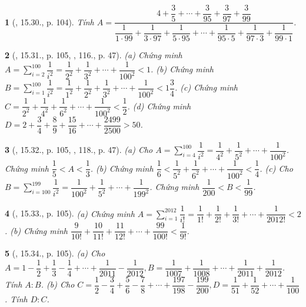 \documentclass{article}
\newtheorem{baitoan}{}
\begin{document}
\begin{baitoan}[\cite{TLCT_THCS_Toan_6_so_hoc}, 15.30., p. 104]
	Tính $A = \dfrac{4 + \dfrac{3}{5} + \cdots + \dfrac{3}{95} + \dfrac{3}{97} + \dfrac{3}{99}}{\dfrac{1}{1\cdot99} + \dfrac{1}{3\cdot97} + \dfrac{1}{5\cdot95} + \cdots + \dfrac{1}{95\cdot5} + \dfrac{1}{97\cdot3} + \dfrac{1}{99\cdot1}}$.
\end{baitoan}

\begin{baitoan}[\cite{TLCT_THCS_Toan_6_so_hoc}, 15.31., p. 105, \cite{Binh_Toan_6_tap_2}, 116., p. 47]
	(a) Chứng minh $A = \sum_{i=2}^{100} \dfrac{1}{i^2} = \dfrac{1}{2^2} + \dfrac{1}{3^2} + \cdots + \dfrac{1}{100^2} < 1$. (b) Chứng minh $B = \sum_{i=1}^{100} \dfrac{1}{i^2} = \dfrac{1}{1^2} + \dfrac{1}{2^2} + \dfrac{1}{3^2} + \cdots + \dfrac{1}{100^2} < 1\dfrac{3}{4}$. (c) Chứng minh $C = \dfrac{1}{2^2} + \dfrac{1}{4^2} + \dfrac{1}{6^2} + \cdots + \dfrac{1}{100^2} < \dfrac{1}{2}$. (d) Chứng minh $D = 2 + \dfrac{3}{4} + \dfrac{8}{9} + \dfrac{15}{16} + \cdots + \dfrac{2499}{2500} > 50$.
\end{baitoan}

\begin{baitoan}[\cite{TLCT_THCS_Toan_6_so_hoc}, 15.32., p. 105, \cite{Binh_Toan_6_tap_2}, 118., p. 47]
	(a) Cho $A = \sum_{i=4}^{100} \dfrac{1}{i^2} = \dfrac{1}{4^2} + \dfrac{1}{5^2} + \cdots + \dfrac{1}{100^2}$. Chứng minh $\dfrac{1}{5} < A < \dfrac{1}{3}$. (b) Chứng minh $\dfrac{1}{6} < \dfrac{1}{5^2} + \dfrac{1}{6^2} + \cdots + \dfrac{1}{100^2} < \dfrac{1}{4}$. (c) Cho $B = \sum_{i=100}^{199} \dfrac{1}{i^2} = \dfrac{1}{100^2} + \dfrac{1}{5^2} + \cdots + \dfrac{1}{199^2}$. Chứng minh $\dfrac{1}{200} < B < \dfrac{1}{99}$.
\end{baitoan}

\begin{baitoan}[\cite{TLCT_THCS_Toan_6_so_hoc}, 15.33., p. 105]
	(a) Chứng minh $A = \sum_{i=1}^{2012} \dfrac{1}{i!} = \dfrac{1}{1!} + \dfrac{1}{2!} + \dfrac{1}{3!} + \cdots + \dfrac{1}{2012!} < 2$. (b) Chứng minh $\dfrac{9}{10!} + \dfrac{10}{11!} + \dfrac{11}{12!} + \cdots + \dfrac{99}{100!} < \dfrac{1}{9!}$.
\end{baitoan}

\begin{baitoan}[\cite{TLCT_THCS_Toan_6_so_hoc}, 15.34., p. 105]
	(a) Cho $A = 1 - \dfrac{1}{2} + \dfrac{1}{3} - \dfrac{1}{4} + \cdots + \dfrac{1}{2011} - \dfrac{1}{2012},B = \dfrac{1}{1007} + \dfrac{1}{1008} + \cdots + \dfrac{1}{2011} + \dfrac{1}{2012}$. Tính $A:B$. (b) Cho $C = \dfrac{1}{2} - \dfrac{3}{4} + \dfrac{5}{6} - \dfrac{7}{8} + \cdots + \dfrac{197}{198} - \dfrac{199}{200},D = \dfrac{1}{51} + \dfrac{1}{52} + \cdots + \dfrac{1}{100}$. Tính $D:C$.
\end{baitoan}
\end{document}
